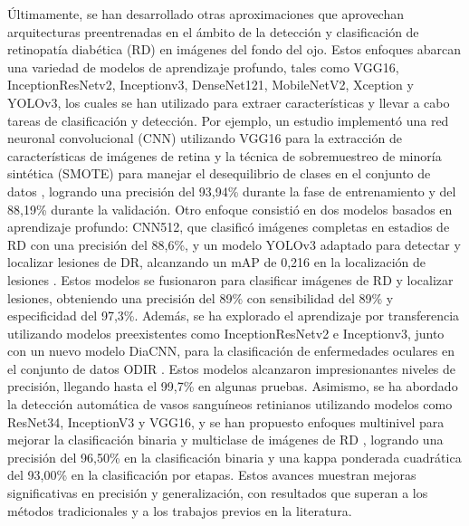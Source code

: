 Últimamente, se han desarrollado otras aproximaciones que aprovechan arquitecturas
preentrenadas en el ámbito de la detección y clasificación de retinopatía diabética (RD)
en imágenes del fondo del ojo. Estos enfoques abarcan una variedad de modelos de
aprendizaje profundo, tales como VGG16, InceptionResNetv2, Inceptionv3, DenseNet121,
MobileNetV2, Xception y YOLOv3, los cuales se han utilizado para extraer características y
llevar a cabo tareas de clasificación y detección. Por ejemplo, un estudio implementó una
red neuronal convolucional (CNN) utilizando VGG16 para la extracción de características de
imágenes de retina y la técnica de sobremuestreo de minoría sintética (SMOTE) para manejar
el desequilibrio de clases en el conjunto de datos , logrando
una precisión del 93,94\% durante la fase de entrenamiento y del 88,19\% durante la
validación. Otro enfoque consistió en dos modelos basados en aprendizaje profundo: CNN512,
que clasificó imágenes completas en estadios de RD con una precisión del 88,6\%, y un
modelo YOLOv3 adaptado para detectar y localizar lesiones de DR, alcanzando un mAP de
0,216 en la localización de lesiones . Estos modelos se
fusionaron para clasificar imágenes de RD y localizar lesiones, obteniendo una precisión
del 89\% con sensibilidad del 89\% y especificidad del 97,3\%. Además, se ha explorado el
aprendizaje por transferencia utilizando modelos preexistentes como InceptionResNetv2 e
Inceptionv3, junto con un nuevo modelo DiaCNN, para la clasificación de enfermedades
oculares en el conjunto de datos ODIR . Estos modelos
alcanzaron impresionantes niveles de precisión, llegando hasta el 99,7\% en algunas
pruebas. Asimismo, se ha abordado la detección automática de vasos sanguíneos retinianos
utilizando modelos como ResNet34, InceptionV3 y VGG16, y se han propuesto enfoques
multinivel  para mejorar la clasificación binaria y
multiclase de imágenes de RD , logrando una precisión del
96,50\% en la clasificación binaria y una kappa ponderada cuadrática del 93,00\% en la
clasificación por etapas. Estos avances muestran mejoras significativas en precisión y
generalización, con resultados que superan a los métodos tradicionales y a los trabajos
previos en la literatura.

